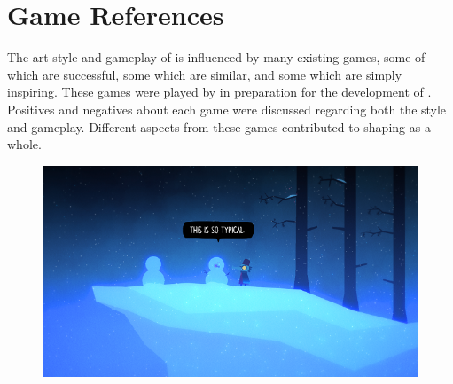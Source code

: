 \section{Game References}
The art style and gameplay of \ourgame{} is influenced by many existing games, some of which are successful, some which are similar, and some which are simply inspiring. These games were played by \ourteam{} in preparation for the development of \ourgame{}. Positives and negatives about each game were discussed regarding both the style and gameplay. Different aspects from these games contributed to shaping \ourgame{} as a whole.

\begin{figure}[H]
\centering\includegraphics[width=0.7\linewidth]{images/game_references}
\end{figure}



\clearpage
